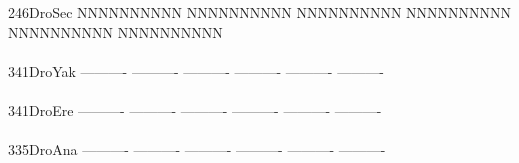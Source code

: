 \documentclass[11pt,twoside,reqno,a4paper]{article}
\begin{document}
{246\hspace*{1\charwidth}DroSec	NNNNNNNNNN	NNNNNNNNNN	NNNNNNNNNN	NNNNNNNNNN	NNNNNNNNNN	NNNNNNNNNN	\\
\hspace*{4\charwidth}\hspace*{7\charwidth}\hspace*{1\charwidth}\hspace*{1\charwidth}\hspace*{1\charwidth}\hspace*{1\charwidth}\hspace*{1\charwidth}\hspace*{1\charwidth}\\
341\hspace*{1\charwidth}DroYak	----------	----------	----------	----------	----------	----------	\\
\hspace*{4\charwidth}\hspace*{7\charwidth}\hspace*{1\charwidth}\hspace*{1\charwidth}\hspace*{1\charwidth}\hspace*{1\charwidth}\hspace*{1\charwidth}\hspace*{1\charwidth}\\
341\hspace*{1\charwidth}DroEre	----------	----------	----------	----------	----------	----------	\\
\hspace*{4\charwidth}\hspace*{7\charwidth}\hspace*{1\charwidth}\hspace*{1\charwidth}\hspace*{1\charwidth}\hspace*{1\charwidth}\hspace*{1\charwidth}\hspace*{1\charwidth}\\
335\hspace*{1\charwidth}DroAna	----------	----------	----------	----------	----------	----------	\\
\hspace*{4\charwidth}\hspace*{7\charwidth}\hspace*{1\charwidth}\hspace*{1\charwidth}\hspace*{1\charwidth}\hspace*{1\charwidth}\hspace*{1\charwidth}\hspace*{1\charwidth}\\
}
\end{document}
